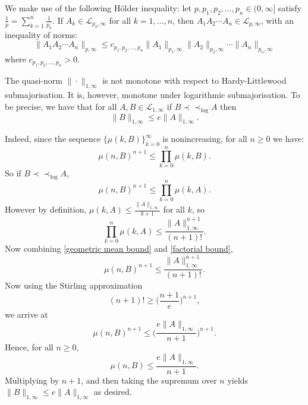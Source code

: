     We make use of the following H\"older inequality: let $p,p_1,p_2,\ldots,p_n \in (0,\infty]$ satisfy $\frac{1}{p} = \sum_{k=1}^n \frac{1}{p_k}$. If $A_k \in \mathcal{L}_{p_k,\infty}$ for all $k = 1,\ldots, n$, then
    $A_1A_2\cdots A_n \in \mathcal{L}_{p,\infty}$, with an inequality of norms:
    \begin{equation}\label{weak-type Holder}
        \|A_1A_2\cdots A_n\|_{p,\infty} \leq c_{p_1,p_2,\ldots,p_n}\|A_1\|_{p_{1},\infty}\|A_2\|_{p_2,\infty}\cdots \|A_n\|_{p_n,\infty}
    \end{equation}
    where $c_{p_1,p_2,\ldots,p_n} > 0$.
    
    The quasi-norm $\|\cdot\|_{1,\infty}$ is not monotone with respect to Hardy-Littlewood submajorisation. It is, however, monotone under
    logarithmic submajorisation. To be precise, we have that for all $A,B \in \mathcal{L}_{1,\infty}$ if $B \prec\prec_{\log} A$
    then
    \begin{equation}\label{log majorization monotone}
        \|B\|_{1,\infty} \leq e\|A\|_{1,\infty}.
    \end{equation}
    
    Indeed, since the sequence $\{\mu(k,B)\}_{k=0}^\infty$ is nonincreasing, for all $n \geq 0$ we have:
    \begin{equation*}
        \mu(n,B)^{n+1} \leq \prod_{k=0}^n \mu(k,B).
    \end{equation*}
    So if $B \prec\prec_{\log} A$,
    \begin{equation}\label{geometric mean bound}
        \mu(n,B)^{n+1} \leq \prod_{k=0}^n \mu(k,A).
    \end{equation}
    However by definition, $\mu(k,A) \leq \frac{\|A\|_{1,\infty}}{k+1}$ for all $k$, so
    \begin{equation}\label{factorial bound}
        \prod_{k=0}^n \mu(k,A) \leq \frac{\|A\|_{1,\infty}^{n+1}}{(n+1)!}.
    \end{equation}
    Now combining \eqref{geometric mean bound} and \eqref{factorial bound}, 
    \begin{equation*}
        \mu(n,B)^{n+1} \leq \frac{\|A\|_{1,\infty}^{n+1}}{(n+1)!}.
    \end{equation*}
    Now using the Stirling approximation
    $$(n+1)!\geq\big(\frac{n+1}{e}\big)^{n+1},$$
    we arrive at
    \begin{equation*}
        \mu(n,B)^{n+1} \leq \Big(\frac{e\|A\|_{1,\infty}}{n+1}\Big)^{n+1}.
    \end{equation*}
    Hence, for all $n\geq 0$,
    \begin{equation*}
        \mu(n,B) \leq\frac{e\|A\|_{1,\infty}}{n+1}.
    \end{equation*}
    Multiplying by $n+1$, and then taking the supremum over $n$ yields $\|B\|_{1,\infty} \leq e\|A\|_{1,\infty}$ as desired.
    
